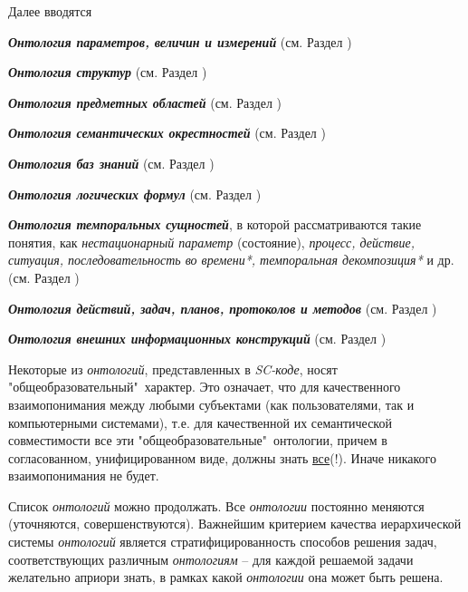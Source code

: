 \begin{SCn}
{Далее вводятся 
\begin{scnitemize}
    \item \textbf{\textit{Онтология параметров, величин и измерений}} (см. Раздел \textit{}) 
    \item \textbf{\textit{Онтология структур}} (см. Раздел \textit{})
    \begin{scnitemizeii}
    \item \textit{\textbf{Онтология предметных областей}} (см. Раздел \textit{})
    \item \textit{\textbf{Онтология семантических окрестностей}} (см. Раздел \textit{})
    \item \textit{\textbf{Онтология баз знаний}} (см. Раздел \textit{})
    \end{scnitemizeii} 
    \item \textit{\textbf{Онтология логических формул}} (см. Раздел \textit{})
    \item \textit{\textbf{Онтология темпоральных сущностей}}, в которой рассматриваются такие понятия, как \textit{нестационарный параметр} (состояние), \textit{процесс, действие, ситуация, последовательность во времени*, темпоральная декомпозиция*} и др. (см. Раздел \textit{})
    \begin{scnitemizeii}
    \item \textbf{\textit{Онтология действий, задач, планов, протоколов и методов}} (см. Раздел \textit{})
    \end{scnitemizeii}
    \item \textit{\textbf{Онтология внешних информационных конструкций}} (см. Раздел \textit{})
\end{scnitemize}


Некоторые из \textit{онтологий}, представленных в \textit{SC-коде}, носят "общеобразовательный"\ характер. Это означает, что для качественного взаимопонимания между любыми субъектами (как пользователями, так и компьютерными системами), т.е. для качественной их семантической совместимости все эти "общеобразовательные"\ онтологии, причем в согласованном, унифицированном виде, должны знать \uline{все}(!). Иначе никакого взаимопонимания не будет.

Список \textit{онтологий} можно продолжать. Все \textit{онтологии} постоянно меняются (уточняются, совершенствуются). Важнейшим критерием качества иерархической системы \textit{онтологий} является стратифицированность способов решения задач, соответствующих различным \textit{онтологиям} -- для каждой решаемой задачи желательно априори знать, в рамках какой \textit{онтологии} она может быть решена.

}
\end{SCn}
